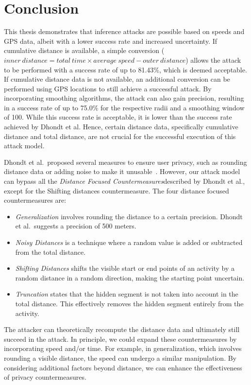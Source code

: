 \documentclass[conference]{IEEEtran}
\begin{document}
\section{\textbf{Conclusion}}

This thesis demonstrates that inference attacks are possible based on speeds
and GPS data, albeit with a lower success rate and increased uncertainty. If
cumulative distance is available, a simple conversion ($inner\ distance =
    total\ time \times average\ speed - outer\ distance \label{eq:inner}$) allows
the attack to be performed with a success rate of up to 81.43\%, which is
deemed acceptable. If cumulative distance data is not available, an additional
conversion can be performed using GPS locations to still achieve a successful
attack. By incorporating smoothing algorithms, the attack can also gain
precision, resulting in a success rate of up to 75.0\% for the respective radii
and a smoothing window of 100. While this success rate is acceptable, it is
lower than the success rate achieved by Dhondt et al. Hence, certain distance
data, specifically cumulative distance and total distance, are not crucial for
the successful execution of this attack model.

Dhondt et al.\ proposed several measures to ensure user privacy, such as
rounding distance data or adding noise to make it unusable~\cite{Dhondt}.
However, our attack model can bypass all the \textit{Distance Focused
    Countermeasures}described by Dhondt et al., except for the Shifting distances
countermeasure. The four distance focused countermeasures are: \begin{itemize}
    \item \textit{Generalization} involves rounding the distance to a certain precision. Dhondt et
          al.\ suggests a precision of 500 meters.
    \item \textit{Noisy Distances} is a technique where a random value is added or subtracted from
          the total distance.
    \item \textit{Shifting Distances} shifts the visible start or end points of an activity by a
          random distance in a random direction, making the starting point uncertain.
    \item \textit{Truncation} states that the hidden segment is not taken into account in the
          total distance. This effectively removes the hidden segment entirely from
          the activity.
\end{itemize}The
attacker can theoretically recompute the distance data and ultimately still
succeed in the attack. In principle, we could expand these countermeasures by
incorporating speed and/or time. For example, in generalization, which involves
rounding a visible distance, the speed can undergo a similar manipulation. By
considering additional factors beyond distance, we can enhance the
effectiveness of privacy countermeasures.
\end{document}
